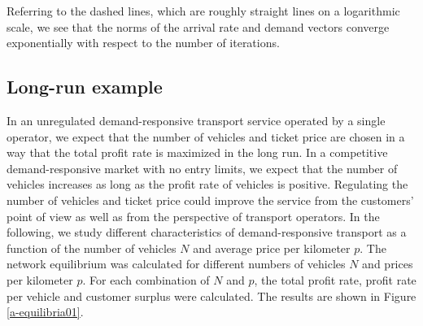 \documentclass[dissertation,draft*]{aaltoseries}
\begin{document}
Referring to the dashed lines, which are roughly straight lines on a logarithmic scale, 
we see that the norms of the arrival rate and demand vectors converge exponentially
with respect to the number of iterations. 


\subsection{Long-run example}
\label{longrun}
In an unregulated demand-responsive transport service operated by a single operator, 
we expect that the number of vehicles and ticket price are chosen in a way that
the total profit rate is maximized in the long run.
In a competitive demand-responsive market with no entry limits, 
we expect that the number of vehicles increases as long as the profit
rate of vehicles is positive. 
Regulating the number of vehicles and ticket price could improve the service
from the customers' point of view as well as from the perspective of transport operators.
In the following, we study different characteristics of demand-responsive transport
as a function of the number of vehicles $N$ and average price per kilometer $p$.
The network equilibrium was calculated for different numbers
of vehicles $N$ and prices per kilometer $p$.
For each combination of $N$ and $p$, the total profit rate, profit 
rate per vehicle and customer surplus were calculated. The results are shown in Figure \ref{a-equilibria01}.
\end{document}
